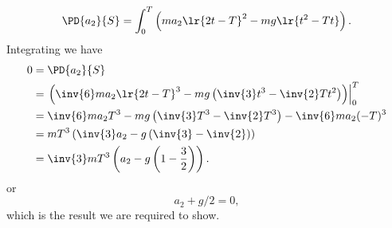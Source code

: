 {\begin{equation}
\PD{a_2}{S} = \int_0^T
\left(
m a_2 \lr{ 2 t - T  }^2
- m g \lr{ t^2 - T t }
\right).
\end{equation}
%
Integrating we have
%
\begin{equation}\label{eqn:classicalMechanicsPs1:640}
\begin{aligned}
0 &= \PD{a_2}{S} \\
&={\left.
\left(
\inv{6} m a_2
\lr{ 2 t - T  }^3
- m g \left(\inv{3}t^3 - \inv{2}T t^2 \right)
\right)\right\vert}_0^T \\
&=
\inv{6} m a_2 T^3 - m g \left(\inv{3}T^3 - \inv{2}T^3 \right)
-
\inv{6} m a_2 (- T )^3 \\
&=
m T^3 \left( \inv{3} a_2 - g \left( \inv{3} - \inv{2} \right) \right) \\
&=
\inv{3} m T^3 \left( a_2 - g \left( 1 - \frac{3}{2} \right) \right) .
\end{aligned}
\end{equation}
%
or
%
\begin{equation}\label{eqn:classicalMechanicsPs1:300}
a_2 + g/2 = 0,
\end{equation}
%
which is the result we are required to show.
} %
